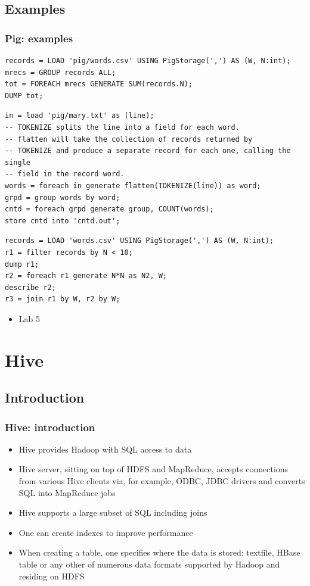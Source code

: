 \documentclass{beamer}
\begin{document}
\subsection{Examples}
\begin{frame}[fragile]
 \frametitle{Pig: examples}
{\color{mycolorcode}
  \begin{lstlisting}[frame=single, basicstyle=\tiny]
records = LOAD 'pig/words.csv' USING PigStorage(',') AS (W, N:int);
mrecs = GROUP records ALL;
tot = FOREACH mrecs GENERATE SUM(records.N);
DUMP tot;
  \end{lstlisting}

  \begin{lstlisting}[frame=single, basicstyle=\tiny]
in = load 'pig/mary.txt' as (line);
-- TOKENIZE splits the line into a field for each word.
-- flatten will take the collection of records returned by
-- TOKENIZE and produce a separate record for each one, calling the single
-- field in the record word.
words = foreach in generate flatten(TOKENIZE(line)) as word;
grpd = group words by word;
cntd = foreach grpd generate group, COUNT(words);
store cntd into 'cntd.out';
  \end{lstlisting}

  \begin{lstlisting}[frame=single, basicstyle=\tiny]
records = LOAD 'words.csv' USING PigStorage(',') AS (W, N:int);
r1 = filter records by N < 10;
dump r1;
r2 = foreach r1 generate N*N as N2, W;
describe r2;
r3 = join r1 by W, r2 by W;
  \end{lstlisting}
}

\begin{itemize}
\item Lab 5
\end{itemize}

\end{frame}


\section{Hive}
\subsection{Introduction}
\begin{frame}
 \frametitle{Hive: introduction}
 \begin{itemize}
  \item Hive provides Hadoop with SQL access to data
  \item Hive server, sitting on top of HDFS and MapReduce, accepts connections from various Hive clients via, for example, ODBC, JDBC drivers and converts SQL into MapReduce jobs
  \item Hive supports a large subset of SQL including joins
  \item One can create indexes to improve performance
  \item When creating a table, one specifies where the data is stored: textfile, HBase table or any other of numerous data formats supported by Hadoop and residing on HDFS
 \end{itemize}

\end{frame}
\end{document}

